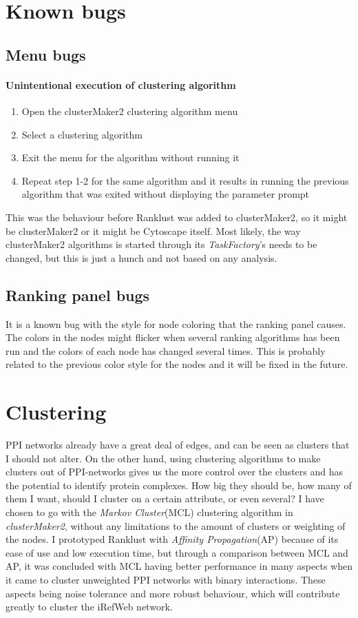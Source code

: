 \section{Known bugs}
\subsection{Menu bugs}
\paragraph{Unintentional execution of clustering algorithm}
\begin{enumerate}
    \item Open the clusterMaker2 clustering algorithm menu
    \item Select a clustering algorithm
    \item Exit the menu for the algorithm without running it
    \item Repeat step 1-2 for the same algorithm and it results in running the
        previous algorithm that was exited without displaying the parameter
        prompt
\end{enumerate}
This was the behaviour before Ranklust was added to clusterMaker2,
so it might be clusterMaker2 or it might be Cytoscape itself. Most likely, the
way clusterMaker2 algorithms is started through its \textit{TaskFactory}'s needs
to be changed, but this is just a hunch and not based on any analysis.

\subsection{Ranking panel bugs}
It is a known bug with the style for node coloring that the ranking panel
causes. The colors in the nodes might flicker when several ranking algorithms
has been run and the colors of each node has changed several times. This is
probably related to the previous color style for the nodes and it will be fixed
in the future.

\section{Clustering}
PPI networks already have a great deal of edges, and can be seen as clusters
that I should not alter. On the other hand, using clustering algorithms to make
clusters out of PPI-networks gives us the more control over the clusters and has
the potential to identify protein complexes\cite{ap-vs-mcl}. How big they should
be, how many of them I want, should I cluster on a certain attribute, or even
several? I have chosen to go with the \textit{Markov Cluster}(MCL)\cite{mcl}
clustering algorithm in \textit{clusterMaker2}, without any limitations to the
amount of clusters or weighting of the nodes. I prototyped Ranklust with
\textit{Affinity Propagation}(AP)\cite{affinity-propagation} because of its ease
of use and low execution time, but through a comparison between MCL and AP, it
was concluded with MCL having better performance in many aspects when it came to
cluster unweighted PPI networks\cite{ap-vs-mcl} with binary interactions. These
aspects being noise tolerance and more robust behaviour, which will contribute
greatly to cluster the iRefWeb network.

